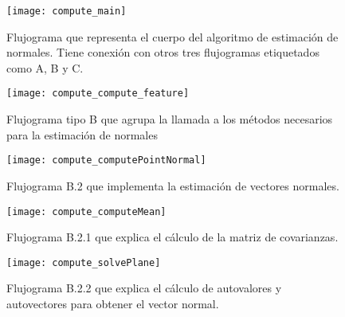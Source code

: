 \begin{figure}[h!]
\centering
\texttt{[image: compute\_main]}
\caption{Flujograma que representa el cuerpo del algoritmo de estimación de normales. Tiene conexión con otros tres flujogramas etiquetados como A, B y C.}\label{fig:compute_main}
\end{figure}

\begin{figure}[h!]
\centering
\texttt{[image: compute\_compute\_feature]}
\caption{Flujograma tipo B que agrupa la llamada a los métodos necesarios para la estimación de normales}\label{fig:compute_compute_feature}
\end{figure}

\begin{figure}[h!]
\centering
\texttt{[image: compute\_computePointNormal]}
\caption{Flujograma B.2 que implementa la estimación de vectores normales.}\label{fig:compute_computePointNormal}
\end{figure}


\begin{figure}[h!]
\centering
\texttt{[image: compute\_computeMean]}
\caption{Flujograma B.2.1 que explica el cálculo de la matriz de covarianzas.}\label{fig:compute_computeMean}
\end{figure}


\begin{figure}[h!]
\centering
\texttt{[image: compute\_solvePlane]}
\caption{Flujograma B.2.2 que explica el cálculo de autovalores y autovectores para obtener el vector normal.}\label{fig:compute_solvePlane}
\end{figure}